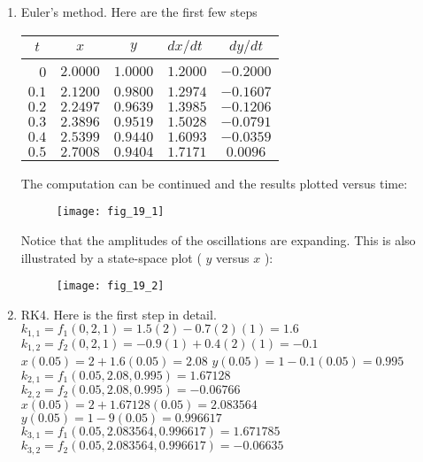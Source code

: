 \documentclass[../main.tex]{subfiles}
\begin{document}
\chapter{}
\label{cha:cha_19}

\section{}
\begin{enumerate}[label=\bfseries(\alph*)]
\item  Euler's method. Here are the first few steps
	\bigbreak
\begin{tabular}{rcclc}
\hline
\multicolumn{1}{c}{$t$} & $x$ & $y$ & $d x / d t$ & $d y / d t$ \\
\hline
0 & $2.0000$ & $1.0000$ & $1.2000$ & $-0.2000$ \\
$0.1$ & $2.1200$ & $0.9800$ & $1.2974$ & $-0.1607$ \\
$0.2$ & $2.2497$ & $0.9639$ & $1.3985$ & $-0.1206$ \\
$0.3$ & $2.3896$ & $0.9519$ & $1.5028$ & $-0.0791$ \\
$0.4$ & $2.5399$ & $0.9440$ & $1.6093$ & $-0.0359$ \\
$0.5$ & $2.7008$ & $0.9404$ & $1.7171$ & $0.0096$ \\
\hline
\end{tabular}
	\bigbreak
The computation can be continued and the results plotted versus time:
	\bigbreak
	\begin{figure}[H]
		\texttt{[image: fig\_19\_1]}
		\label{fig:fig_19_1}
	\end{figure}
	\bigbreak
Notice that the amplitudes of the oscillations are expanding. This is also illustrated by a state-space plot ( $y$ versus $x$ ):
	\bigbreak
	\begin{figure}[H]
		\texttt{[image: fig\_19\_2]}
		\label{fig:fig_19_2}
	\end{figure}
	\bigbreak
\item RK4. Here is the first step in detail.
	\bigbreak
$k_{1,1}=f_{1}(0,2,1)=1.5(2)-0.7(2)(1)=1.6$
	\bigbreak
$k_{1,2}=f_{2}(0,2,1)=-0.9(1)+0.4(2)(1)=-0.1$
	\bigbreak
$x(0.05)=2+1.6(0.05)=2.08 $
	\bigbreak
$y(0.05)=1-0.1(0.05)=0.995 $
	\bigbreak
$k_{2,1}=f_{1}(0.05,2.08,0.995)=1.67128 $
	\bigbreak
$k_{2,2}=f_{2}(0.05,2.08,0.995)=-0.06766 $
	\bigbreak
$x(0.05)=2+1.67128(0.05)=2.083564 $
	\bigbreak
$y(0.05)=1-9(0.05)=0.996617 $
	\bigbreak
$k_{3,1}=f_{1}(0.05,2.083564,0.996617)=1.671785 $
	\bigbreak
$k_{3,2}=f_{2}(0.05,2.083564,0.996617)=-0.06635 $

\end{enumerate}
\end{document}
